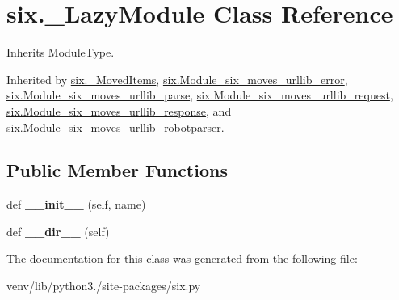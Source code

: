 \hypertarget{classsix_1_1___lazy_module}{}\section{six.\+\_\+\+Lazy\+Module Class Reference}
\label{classsix_1_1___lazy_module}


Inherits Module\+Type.



Inherited by \hyperlink{classsix_1_1___moved_items}{six.\+\_\+\+Moved\+Items}, \hyperlink{classsix_1_1_module__six__moves__urllib__error}{six.\+Module\+\_\+six\+\_\+moves\+\_\+urllib\+\_\+error}, \hyperlink{classsix_1_1_module__six__moves__urllib__parse}{six.\+Module\+\_\+six\+\_\+moves\+\_\+urllib\+\_\+parse}, \hyperlink{classsix_1_1_module__six__moves__urllib__request}{six.\+Module\+\_\+six\+\_\+moves\+\_\+urllib\+\_\+request}, \hyperlink{classsix_1_1_module__six__moves__urllib__response}{six.\+Module\+\_\+six\+\_\+moves\+\_\+urllib\+\_\+response}, and \hyperlink{classsix_1_1_module__six__moves__urllib__robotparser}{six.\+Module\+\_\+six\+\_\+moves\+\_\+urllib\+\_\+robotparser}.

\subsection*{Public Member Functions}
\begin{DoxyCompactItemize}
\item 
\mbox{\label{classsix_1_1___lazy_module_a7c22088db3bceb8a372f3547d9ddfd53}} 
def {\bfseries \+\_\+\+\_\+init\+\_\+\+\_\+} (self, name)
\item 
\mbox{\label{classsix_1_1___lazy_module_a3550253661aad92848159f3074e2e9c5}} 
def {\bfseries \+\_\+\+\_\+dir\+\_\+\+\_\+} (self)
\end{DoxyCompactItemize}


The documentation for this class was generated from the following file\+:\begin{DoxyCompactItemize}
\item 
venv/lib/python3./site-\/packages/six.\+py\end{DoxyCompactItemize}
